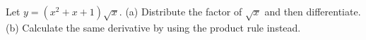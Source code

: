 Let $y=(x^2+x+1)\sqrt{x}$. (a) Distribute the factor of $\sqrt{x}$ and
then differentiate.\hwendpart (b) Calculate the same derivative by using the
product rule instead.\answercheck\hwendpart
